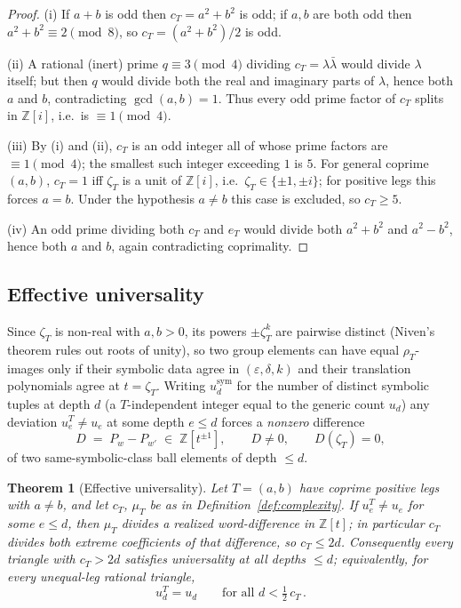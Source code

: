 \documentclass[11pt]{article}
\theoremstyle{plain}
\newtheorem{theorem}{Theorem}
\theoremstyle{definition}
\theoremstyle{remark}
\begin{document}
\begin{proof}
(i) If $a+b$ is odd then $c_T = a^2+b^2$ is odd; if $a,b$ are both odd
then $a^2+b^2 \equiv 2 \pmod 8$, so $c_T = (a^2+b^2)/2$ is odd.

(ii) A rational (inert) prime $q \equiv 3 \pmod 4$ dividing
$c_T = \lambda\bar\lambda$ would divide $\lambda$ itself; but then $q$
would divide both the real and imaginary parts of $\lambda$, hence both
$a$ and $b$, contradicting $\gcd(a,b) = 1$. Thus every odd prime factor
of $c_T$ splits in $\mathbb{Z}[i]$, i.e.\ is $\equiv 1 \pmod 4$.

(iii) By (i) and (ii), $c_T$ is an odd integer all of whose prime
factors are $\equiv 1 \pmod 4$; the smallest such integer exceeding $1$
is $5$. For general coprime $(a,b)$, $c_T = 1$ iff $\zeta_T$ is a unit
of $\mathbb{Z}[i]$, i.e.\ $\zeta_T \in \{\pm 1, \pm i\}$; for positive
legs this forces $a = b$. Under the hypothesis $a \ne b$ this case is
excluded, so $c_T \ge 5$.

(iv) An odd prime dividing both $c_T$ and $e_T$ would divide both
$a^2+b^2$ and $a^2-b^2$, hence both $a$ and $b$, again contradicting
coprimality.
\end{proof}

\subsection{Effective universality}

Since $\zeta_T$ is non-real with $a,b > 0$, its powers $\pm\zeta_T^k$ are
pairwise distinct (Niven's theorem rules out roots of unity), so two
group elements can have equal $\rho_T$-images only if their symbolic
data agree in $(\varepsilon, \delta, k)$ and their translation
polynomials agree at $t = \zeta_T$. Writing $u_d^{\mathrm{sym}}$ for the
number of distinct symbolic tuples at depth $d$ (a $T$-independent
integer equal to the generic count $u_d$) any deviation
$u_e^T \ne u_e$ at some depth $e \le d$ forces a \emph{nonzero}
difference
\begin{equation}
\label{eq:collision-vanishing-eff}
D \;=\; P_w - P_{w'} \;\in\; \mathbb{Z}[t^{\pm 1}],
\qquad D \ne 0, \qquad D(\zeta_T) = 0,
\end{equation}
of two same-symbolic-class ball elements of depth $\le d$.

\begin{theorem}[Effective universality]
\label{thm:effective-universality}
Let $T = (a,b)$ have coprime positive legs with $a \ne b$, and let
$c_T$, $\mu_T$ be as in Definition~\ref{def:complexity}. If
$u_e^T \ne u_e$ for some $e \le d$, then $\mu_T$ divides a realized
word-difference in $\mathbb{Z}[t]$; in particular $c_T$ divides
\emph{both extreme coefficients} of that difference, so $c_T \le 2d$.
Consequently every triangle with $c_T > 2d$ satisfies universality at
all depths $\le d$; equivalently, for every unequal-leg rational
triangle,
\[
u_d^T = u_d \qquad \text{for all } d < \tfrac{1}{2}\,c_T \, .
\]
\end{theorem}
\end{document}
